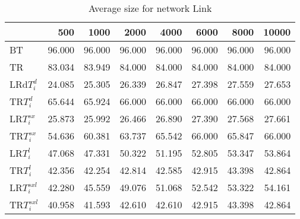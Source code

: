 \begin{table}
\begin{center}
\begin{tabular}{lrrrrrrr}
 & 500 &  1000 & 2000 & 4000 & 6000& 8000&  10000\\\hline
BT & 96.000 & 96.000 & 96.000 & 96.000 & 96.000 & 96.000 & 96.000\\\hline
TR & 83.034 & 83.949 & 84.000 & 84.000 & 84.000 & 84.000 & 84.000\\\hline
LRd$T_i^d$ & 24.085 & 25.305 & 26.339 & 26.847 & 27.398 & 27.559 & 27.653\\\hline
TR$T_i^d$ & 65.644 & 65.924 & 66.000 & 66.000 & 66.000 & 66.000 & 66.000\\\hline
LR$T_i^{sx}$ & 25.873 & 25.992 & 26.466 & 26.890 & 27.390 & 27.568 & 27.661\\\hline
TR$T_i^{sx}$ & 54.636 & 60.381 & 63.737 & 65.542 & 66.000 & 65.847 & 66.000\\\hline
LR$T_i^l$ & 47.068 & 47.331 & 50.322 & 51.195 & 52.805 & 53.347 & 53.864\\\hline
TR$T_i^l$ & 42.356 & 42.254 & 42.814 & 42.585 & 42.915 & 43.398 & 42.864\\\hline
LR$T_i^{sxl}$ & 42.280 & 45.559 & 49.076 & 51.068 & 52.542 & 53.322 & 54.161\\\hline
TR$T_i^{sxl}$ & 40.958 & 41.593 & 42.610 & 42.610 & 42.915 & 43.398 & 42.864\\\hline
\end{tabular}
\end{center}
\caption{Average size for network Link }
\label{Linksi}
\end{table}

